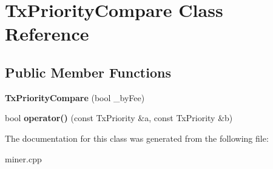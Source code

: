 \hypertarget{class_tx_priority_compare}{}\section{Tx\+Priority\+Compare Class Reference}
\label{class_tx_priority_compare}
\subsection*{Public Member Functions}
\begin{DoxyCompactItemize}
\item 
\mbox{\label{class_tx_priority_compare_a2ee1aac9d165bbeaaf2a687373f318ad}} 
{\bfseries Tx\+Priority\+Compare} (bool \+\_\+by\+Fee)
\item 
\mbox{\label{class_tx_priority_compare_ab50fdbeb5862709d13a271c11ade1775}} 
bool {\bfseries operator()} (const Tx\+Priority \&a, const Tx\+Priority \&b)
\end{DoxyCompactItemize}


The documentation for this class was generated from the following file\+:\begin{DoxyCompactItemize}
\item 
miner.\+cpp\end{DoxyCompactItemize}
